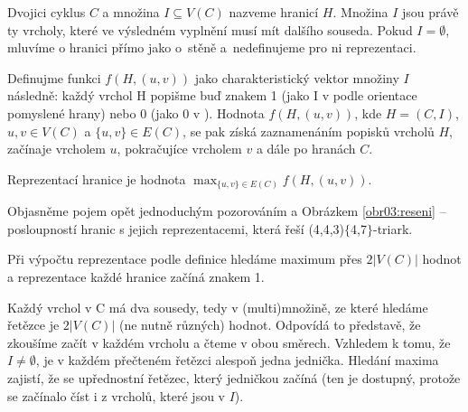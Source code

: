\begin{definice}\label{def01:1}
Dvojici cyklus $C$ a množina $I \subseteq V(C)$ nazveme hranicí $H$. Množina $I$ jsou právě ty vrcholy, které ve výsledném vyplnění musí mít dalšího souseda. Pokud  $I = \emptyset$, mluvíme o hranici přímo jako o~stěně a~nedefinujeme pro ni reprezentaci.

Definujme funkci $f(H,(u,v))$ jako charakteristický vektor množiny $I$ následně: každý vrchol H popišme buď znakem 1 (jako I v  podle orientace pomyslené hrany) nebo 0 (jako 0 v ). Hodnota $f(H, (u, v))$, kde $H=(C, I)$, $u, v \in V(C)$ a $ \lbrace u, v \rbrace \in E(C)$, se pak získá zaznamenáním popisků vrcholů $H$, začínaje vrcholem $u$, pokračujíce vrcholem $v$ a dále po hranách $C$. 

Reprezentací hranice je hodnota $\max_{\lbrace u, v \rbrace \in E(C)} {f(H,(u,v))}$.
\end{definice}

Objasněme pojem opět jednoduchým pozorováním a Obrázkem \ref{obr03:reseni} -- posloupností hranic s jejich reprezentacemi, která řeší (4,4,3)$\lbrace$4,7$\rbrace$-triark. 


\begin{tvrz}
Při výpočtu reprezentace podle definice hledáme maximum přes $2 |V(C)|$ hodnot a reprezentace každé hranice začíná znakem 1.
\end{tvrz}

\begin{dukaz}
Každý vrchol v C má dva sousedy, tedy v (multi)množině, ze které hledáme řetězce je $2 |V(C)|$ (ne nutně různých) hodnot. Odpovídá to představě, že zkoušíme začít v každém vrcholu a čteme v obou směrech. Vzhledem k tomu, že $I\neq \emptyset$, je v každém přečteném řetězci alespoň jedna jednička. Hledání maxima zajistí, že se upřednostní řetězec, který jedničkou začíná (ten je dostupný, protože se začínalo číst i z vrcholů, které jsou v $I$).  
\end{dukaz}

\makeatletter
\algrenewcommand\ALG@beginalgorithmic{\footnotesize}
\makeatother



